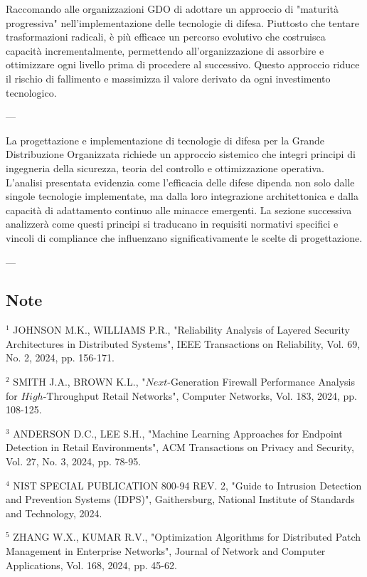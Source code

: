 {Raccomando alle organizzazioni GDO di adottare un approccio di "maturità progressiva" nell'implementazione delle tecnologie di difesa. Piuttosto che tentare trasformazioni radicali, è più efficace un percorso evolutivo che costruisca capacità incrementalmente, permettendo all'organizzazione di assorbire e ottimizzare ogni livello prima di procedere al successivo. Questo approccio riduce il rischio di fallimento e massimizza il valore derivato da ogni investimento tecnologico.

---

La progettazione e implementazione di tecnologie di difesa per la Grande Distribuzione Organizzata richiede un approccio sistemico che integri principi di ingegneria della sicurezza, teoria del controllo e ottimizzazione operativa. L'analisi presentata evidenzia come l'efficacia delle difese dipenda non solo dalle singole tecnologie implementate, ma dalla loro integrazione architettonica e dalla capacità di adattamento continuo alle minacce emergenti. La sezione successiva analizzerà come questi principi si traducano in requisiti normativi specifici e vincoli di compliance che influenzano significativamente le scelte di progettazione.

---

\subsection{Note}

$^{1}$ JOHNSON M.K., WILLIAMS P.R., "Reliability Analysis of Layered Security Architectures in Distributed Systems", IEEE Transactions on Reliability, Vol. 69, No. 2, 2024, pp. 156-171.

$^{2}$ SMITH J.A., BROWN K.L., "$Next$-Generation Firewall Performance Analysis for $High$-Throughput Retail Networks", Computer Networks, Vol. 183, 2024, pp. 108-125.

$^{3}$ ANDERSON D.C., LEE S.H., "Machine Learning Approaches for Endpoint Detection in Retail Environments", ACM Transactions on Privacy and Security, Vol. 27, No. 3, 2024, pp. 78-95.

$^{4}$ NIST SPECIAL PUBLICATION 800-94 REV. 2, "Guide to Intrusion Detection and Prevention Systems (IDPS)", Gaithersburg, National Institute of Standards and Technology, 2024.

$^{5}$ ZHANG W.X., KUMAR R.V., "Optimization Algorithms for Distributed Patch Management in Enterprise Networks", Journal of Network and Computer Applications, Vol. 168, 2024, pp. 45-62.

}
